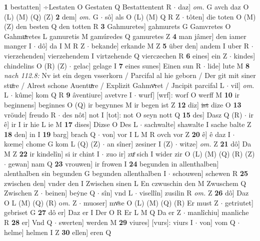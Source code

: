\documentclass[8pt,a4paper,notitlepage]{article}
\begin{document}
\begin{table}[ht]
\begin{minipage}[t]{0.5\linewidth}
\textbf{1} bestatten] ÷Lestaten O Gestaten Q Bestattentent R  $\cdot$ daz] \textit{om.} G avch daz O (L) (M) (Q) (Z) \textbf{2} dem] \textit{om.} G  $\cdot$ sô] als O (L) (M) Q R Z  $\cdot$ tôten] die toten O (M) (Z) den besten Q den totten R \textbf{3} Gahmuretes] gahmurets G Gamvretes O Gahmuͯretes L gamuretis M gamúredes Q gamuretes Z \textbf{4} man jâmer] den iamer manger I  $\cdot$ dô] da I M R Z  $\cdot$ bekande] erkande M Z \textbf{5} über den] andem I uber R  $\cdot$ vierzehenden] vierzehendem I virtzehende Q vierczechen R \textbf{6} eines] ein Z  $\cdot$ kindes] chindelins O (R) (Z)  $\cdot$ gelac] gelage I \textbf{7} eines sunes] Einen sun R  $\cdot$ lide] lute M \textbf{8} \textit{nach 112.8:} Nv ist ein degen vsserkorn / Parcifal al hie geborn / Der git mit siner stuͦre / Alrest schone Auentuͯre / Explizit Gahmvͯret / Jncipit parcifal L   $\cdot$ vil] \textit{om.} L  $\cdot$ kûme] kom Q R \textbf{9} âventiure] avetvre I  $\cdot$ wurf] [wrf]: worf O werff M \textbf{10} ir beginnens] beginnes O (Q) ir begynnes M ir begen ist Z \textbf{12} diz] \sout{ist} dize O \textbf{13} vröude] freudo R  $\cdot$ des nôt] not I [tot]: not O seyn nott Q \textbf{15} des] Dasz Q (R)  $\cdot$ ir ê] ir I ir hie L ie M \textbf{17} dises] Dizse O Des L  $\cdot$ sachwalte] shawalte I sache balte Z \textbf{18} den] in I \textbf{19} barg] brach Q  $\cdot$ von] vor I L M R ovch vor Z \textbf{20} ê] ê daz I  $\cdot$ kœme] chome G kom L (Q) (Z)  $\cdot$ an sîner] zesiner I (Z)  $\cdot$ witze] \textit{om.} Z \textbf{21} dô] Da M Z \textbf{22} ir kindelîn] si ir chint I  $\cdot$ zuo ir] zuͤ sich I wider zir O (L) (M) (Q) (R) (Z)  $\cdot$ gewan] nam Q \textbf{23} vrouwen] ir frowen I \textbf{24} begunden in allenthalben] alenthalben sin begunden G begunden allenthalben I  $\cdot$ schouwen] schewen R \textbf{25} zwischen den] vnder den I Zwischen sinen L En czwuschin den M Zwuschem Q Zwischen Z  $\cdot$ beinen] beẏne Q  $\cdot$ sîn] vnd L  $\cdot$ visellîn] zusilin R \textit{om.} Z \textbf{26} dô] Daz O L (M) (Q) (R) o\textit{m. } Z  $\cdot$ muoser] mvͦse O (L) (M) (Q) (R) Er must Z  $\cdot$ getriutet] gebriset G \textbf{27} dô er] Daz er I Der O R Er L M Q Da er Z  $\cdot$ manlîchiu] manliche R \textbf{28} er] Vnd Q  $\cdot$ swerten] werden M \textbf{29} viures] [vurs]: viurs I  $\cdot$ von] vom Q  $\cdot$ helme] helmen I Z \textbf{30} ellen] eren Q \newline
\end{minipage}
\hspace{0.5cm}
\begin{minipage}[t]{0.5\linewidth}

\end{minipage}
\end{table}
\end{document}
